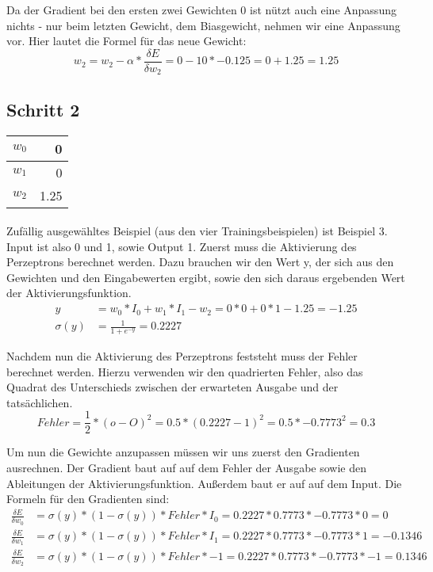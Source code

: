 \documentclass[a4paper]{article}
\begin{document}
Da der Gradient bei den ersten zwei Gewichten 0 ist nützt auch eine Anpassung nichts - nur beim letzten Gewicht, dem Biasgewicht, nehmen wir eine Anpassung vor. Hier lautet die Formel für das neue Gewicht:
\[
	w_2 = w_2 - \alpha * \frac{\delta E}{\delta w_2} = 0 - 10 * -0.125 = 0 + 1.25 = 1.25
\]

\subsection{Schritt 2}
\begin{tabular}{|l|r|}
	\hline
	$w_0$ & 0 \\\hline
	$w_1$ & 0 \\\hline
	$w_2$ & 1.25 \\\hline
\end{tabular}
\paragraph{}
Zufällig ausgewähltes Beispiel (aus den vier Trainingsbeispielen) ist Beispiel 3. Input ist also 0 und 1, sowie Output 1.
Zuerst muss die Aktivierung des Perzeptrons berechnet werden. Dazu brauchen wir den Wert y, der sich aus den Gewichten und den Eingabewerten ergibt, sowie den sich daraus ergebenden Wert der Aktivierungsfunktion.
\begin{align*}
	y &= w_0 * I_0 + w_1 * I_1 - w_2 = 0 * 0 + 0 * 1 - 1.25 = -1.25 \\
	\sigma(y) &= \frac{1}{1 + e^{-y}} = 0.2227
\end{align*}

Nachdem nun die Aktivierung des Perzeptrons feststeht muss der Fehler berechnet werden. Hierzu verwenden wir den quadrierten Fehler, also das Quadrat des Unterschieds zwischen der erwarteten Ausgabe und der tatsächlichen.
\[
	Fehler = \frac{1}{2} * (o - O)^2 = 0.5 * (0.2227 - 1)^2 = 0.5 * -0.7773^2 = 0.3
\]

Um nun die Gewichte anzupassen müssen wir uns zuerst den Gradienten ausrechnen.
Der Gradient baut auf auf dem Fehler der Ausgabe sowie den Ableitungen der Aktivierungsfunktion. Außerdem baut er auf auf dem Input. Die Formeln für den Gradienten sind:
\begin{align*}
	\frac{\delta E}{\delta w_0} &= \sigma(y) * (1 - \sigma(y)) * Fehler * I_0 = 0.2227 * 0.7773 * -0.7773 * 0 = 0 \\
	\frac{\delta E}{\delta w_1} &= \sigma(y) * (1 - \sigma(y)) * Fehler * I_1 = 0.2227 * 0.7773 * -0.7773 * 1 = -0.1346 \\
	\frac{\delta E}{\delta w_2} &= \sigma(y) * (1 - \sigma(y)) * Fehler * -1 = 0.2227 * 0.7773 * -0.7773 * -1 = 0.1346
\end{align*}
\end{document}

